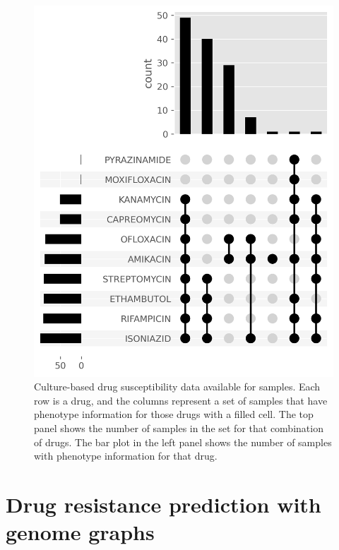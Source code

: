 \begin{figure}
\begin{center}
\includegraphics[width=0.90\columnwidth]{Chapter3/Figs/available_dst.png}
\caption{{Culture-based drug susceptibility data available for samples. Each row is a drug, and the columns represent a set of samples that have phenotype information for those drugs with a filled cell. The top panel shows the number of samples in the set for that combination of drugs. The bar plot in the left panel shows the number of samples with phenotype information for that drug.
{\label{fig:available-dst}}
}}
\end{center}
\end{figure}
\section{Drug resistance prediction with genome graphs}
\label{sec:drprg-methods}

